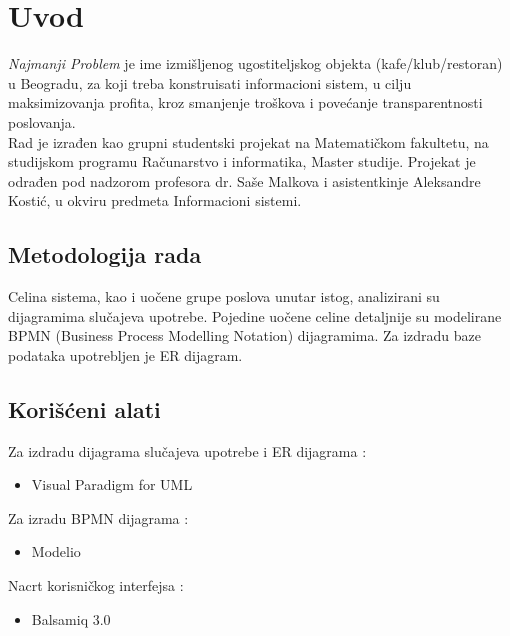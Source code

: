 \documentclass{article}
\begin{document}
\tableofcontents
\newpage

\section{Uvod}
\emph{Najmanji Problem} je ime izmišljenog ugostiteljskog objekta (kafe/klub/restoran) u Beogradu, za koji treba konstruisati informacioni sistem, u cilju maksimizovanja profita, kroz smanjenje troškova i povećanje transparentnosti
poslovanja.\\


Rad je izrađen kao grupni studentski projekat na Matematičkom fakultetu, na studijskom programu Računarstvo i informatika,  Master studije. Projekat je odrađen pod nadzorom profesora dr. Saše Malkova i asistentkinje Aleksandre Kostić, u okviru predmeta Informacioni sistemi.\\





\subsection{Metodologija rada}

Celina sistema, kao i uočene grupe poslova unutar istog, analizirani su dijagramima slučajeva upotrebe. Pojedine uočene celine detaljnije su modelirane BPMN (Business Process Modelling Notation) dijagramima. Za izdradu baze podataka upotrebljen je ER dijagram.


\subsection{Korišćeni alati}
Za izdradu dijagrama slučajeva upotrebe i ER dijagrama :
\begin{itemize}
\item Visual Paradigm for UML
\end{itemize}
Za izradu BPMN dijagrama :
\begin{itemize}
\item Modelio
\end{itemize}
Nacrt korisničkog interfejsa :
\begin{itemize}
\item Balsamiq 3.0
\end{itemize}
\end{document}

